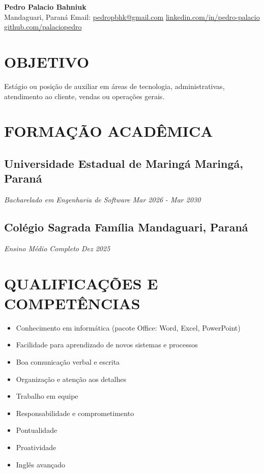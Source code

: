 \documentclass[a4paper,10pt]{article}
\begin{document}
\begin{center}
    {\LARGE \textbf{Pedro Palacio Bahniuk}} 
    \\ [0.1cm]
    Mandaguari, Paraná
    {\textbullet}
    Email: \href{mailto:pedropbhk@gmail.com}{pedropbhk@gmail.com} 
    {\textbullet}
    \href{https://www.linkedin.com/in/pedro-palacio}{linkedin.com/in/pedro-palacio} 
    {\textbullet}
    \href{https://github.com/palaciopedro}{github.com/palaciopedro}
\end{center}



\section{OBJETIVO}
        Estágio ou posição de auxiliar em áreas de tecnologia, administrativas, atendimento ao cliente, vendas ou operações gerais.

\section{FORMAÇÃO ACADÊMICA}
    \subsection*{\texorpdfstring{
            \textbf{Universidade Estadual de Maringá} \hfill Maringá, Paraná
        }{
            Nome da Sua Universidade (Educação) -- Localização
        }}
    \textit{Bacharelado em Engenharia de Software \hfill Mar 2026 - Mar 2030 }
    
    \subsection*{\texorpdfstring{
            \textbf{Colégio Sagrada Família} \hfill Mandaguari, Paraná
        }{
            Nome da Sua Universidade (Educação) -- Localização
        }}
    \textit{Ensino Médio Completo \hfill Dez 2025 }

\section{QUALIFICAÇÕES E COMPETÊNCIAS}
    \begin{itemize}
        \item Conhecimento em informática (pacote Office: Word, Excel, PowerPoint)
        \item Facilidade para aprendizado de novos sistemas e processos
        \item Boa comunicação verbal e escrita
        \item Organização e atenção aos detalhes
        \item Trabalho em equipe
        \item Responsabilidade e comprometimento
        \item Pontualidade
        \item Proatividade
        \item Inglês avançado
    \end{itemize}
\end{document}
